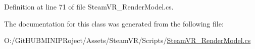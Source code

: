 Definition at line 71 of file Steam\+V\+R\+\_\+\+Render\+Model.\+cs.



The documentation for this class was generated from the following file\+:\begin{DoxyCompactItemize}
\item 
O\+:/\+Git\+H\+U\+B\+M\+I\+N\+I\+P\+Roject/\+Assets/\+Steam\+V\+R/\+Scripts/\mbox{\hyperlink{_steam_v_r___render_model_8cs}{Steam\+V\+R\+\_\+\+Render\+Model.\+cs}}\end{DoxyCompactItemize}
